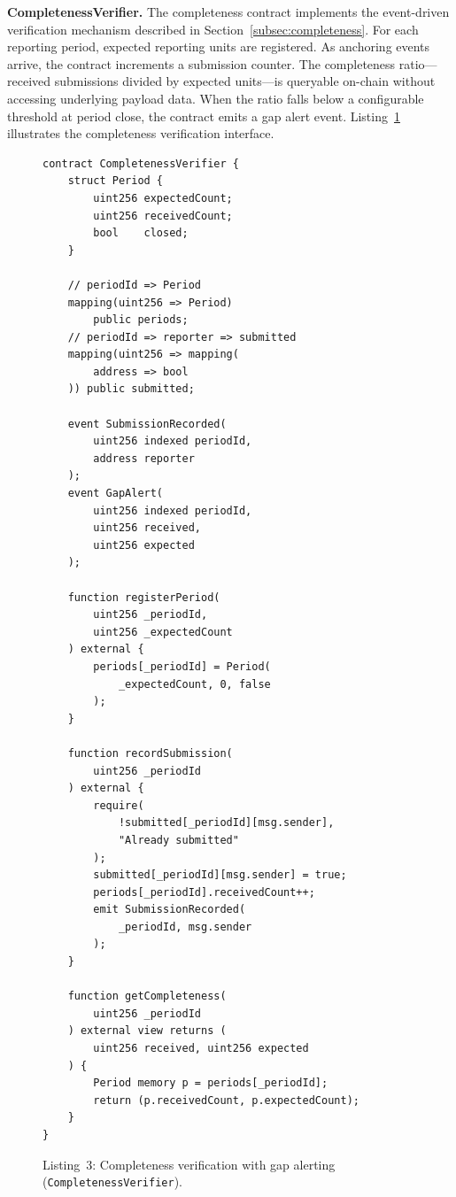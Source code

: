 \textbf{CompletenessVerifier.} The completeness contract implements the event-driven verification mechanism described in Section~\ref{subsec:completeness}. For each reporting period, expected reporting units are registered. As anchoring events arrive, the contract increments a submission counter. The completeness ratio---received submissions divided by expected units---is queryable on-chain without accessing underlying payload data. When the ratio falls below a configurable threshold at period close, the contract emits a gap alert event. Listing~\ref{lst:completeness} illustrates the completeness verification interface.

\begin{figure}[!ht]
\begin{verbatim}
contract CompletenessVerifier {
    struct Period {
        uint256 expectedCount;
        uint256 receivedCount;
        bool    closed;
    }

    // periodId => Period
    mapping(uint256 => Period)
        public periods;
    // periodId => reporter => submitted
    mapping(uint256 => mapping(
        address => bool
    )) public submitted;

    event SubmissionRecorded(
        uint256 indexed periodId,
        address reporter
    );
    event GapAlert(
        uint256 indexed periodId,
        uint256 received,
        uint256 expected
    );

    function registerPeriod(
        uint256 _periodId,
        uint256 _expectedCount
    ) external {
        periods[_periodId] = Period(
            _expectedCount, 0, false
        );
    }

    function recordSubmission(
        uint256 _periodId
    ) external {
        require(
            !submitted[_periodId][msg.sender],
            "Already submitted"
        );
        submitted[_periodId][msg.sender] = true;
        periods[_periodId].receivedCount++;
        emit SubmissionRecorded(
            _periodId, msg.sender
        );
    }

    function getCompleteness(
        uint256 _periodId
    ) external view returns (
        uint256 received, uint256 expected
    ) {
        Period memory p = periods[_periodId];
        return (p.receivedCount, p.expectedCount);
    }
}
\end{verbatim}
\caption*{Listing~3: Completeness verification with gap alerting (\texttt{CompletenessVerifier}).}\label{lst:completeness}
\end{figure}

